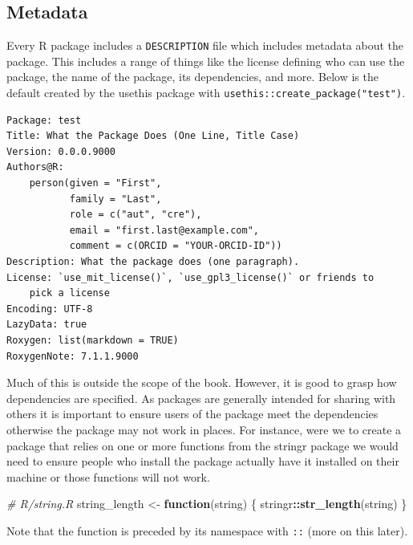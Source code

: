 \documentclass[
]{krantz}
\makeatletter
\newenvironment{Shaded}{\begin{snugshade}}{\end{snugshade}}
\newcommand{\CommentTok}[1]{\textcolor[rgb]{0.37,0.37,0.37}{\textit{#1}}}
\newcommand{\ControlFlowTok}[1]{\textcolor[rgb]{0.27,0.27,0.27}{\textbf{#1}}}
\newcommand{\KeywordTok}[1]{\textcolor[rgb]{0.27,0.27,0.27}{\textbf{#1}}}
\newcommand{\NormalTok}[1]{#1}
\newcommand{\OperatorTok}[1]{\textcolor[rgb]{0.43,0.43,0.43}{\textbf{#1}}}
\newcommand{\StringTok}[1]{\textcolor[rgb]{0.5,0.5,0.5}{#1}}
\newenvironment{kframe}{%
\medskip{}
\setlength{\fboxsep}{.8em}
 \def\at@end@of@kframe{}%
 \ifinner\ifhmode%
  \def\at@end@of@kframe{\end{minipage}}%
  \begin{minipage}{\columnwidth}%
 \fi\fi%
 \def\FrameCommand##1{\hskip\@totalleftmargin \hskip-\fboxsep
 \colorbox{shadecolor}{##1}\hskip-\fboxsep
     \hskip-\linewidth \hskip-\@totalleftmargin \hskip\columnwidth}%
 \MakeFramed {\advance\hsize-\width
   \@totalleftmargin\z@ \linewidth\hsize
   \@setminipage}}%
 {\par\unskip\endMakeFramed%
 \at@end@of@kframe}
\renewenvironment{Shaded}{\begin{kframe}}{\end{kframe}}
\newenvironment{rmdblock}[1]
  {
  \begin{itemize}
  \renewcommand{\labelitemi}{
    \raisebox{-.7\height}[0pt][0pt]{
      {\setkeys{Gin}{width=3em,keepaspectratio}\texttt{[image: images/\#1]}}
    }
  }
  \setlength{\fboxsep}{1em}
  \begin{kframe}
  \item
  }
  {
  \end{kframe}
  \end{itemize}
  }
\newenvironment{rmdnote}
  {\begin{rmdblock}{note}}
  {\end{rmdblock}}
\makeatother
\begin{document}
\hypertarget{basics-metadata}{%
\subsection{Metadata}\label{basics-metadata}}

Every R package includes a \texttt{DESCRIPTION} file which includes metadata about the package. This includes a range of things like the license defining who can use the package, the name of the package, its dependencies, and more. Below is the default created by the usethis package with \texttt{usethis::create\_package("test")}.

\begin{verbatim}
Package: test
Title: What the Package Does (One Line, Title Case)
Version: 0.0.0.9000
Authors@R: 
    person(given = "First",
           family = "Last",
           role = c("aut", "cre"),
           email = "first.last@example.com",
           comment = c(ORCID = "YOUR-ORCID-ID"))
Description: What the package does (one paragraph).
License: `use_mit_license()`, `use_gpl3_license()` or friends to
    pick a license
Encoding: UTF-8
LazyData: true
Roxygen: list(markdown = TRUE)
RoxygenNote: 7.1.1.9000
\end{verbatim}

Much of this is outside the scope of the book. However, it is good to grasp how dependencies are specified. As packages are generally intended for sharing with others it is important to ensure users of the package meet the dependencies otherwise the package may not work in places. For instance, were we to create a package that relies on one or more functions from the stringr \citep{R-stringr} package we would need to ensure people who install the package actually have it installed on their machine or those functions will not work.

\begin{Shaded}
\begin{Highlighting}[]
\CommentTok{\# R/string.R}
\NormalTok{string\_length \textless{}{-}}\StringTok{ }\ControlFlowTok{function}\NormalTok{(string) \{}
\NormalTok{  stringr}\OperatorTok{::}\KeywordTok{str\_length}\NormalTok{(string)}
\NormalTok{\}}
\end{Highlighting}
\end{Shaded}

\begin{rmdnote}
Note that the function is preceded by its namespace with \texttt{::}
(more on this later).
\end{rmdnote}
\end{document}
